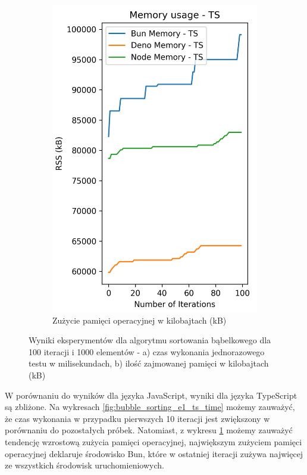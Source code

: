 \begin{figure}[H]
\begin{subfigure}[b]{0.42\textwidth}
    \includegraphics[width=\textwidth]{Figures/sorting/sorting_bubble_100_1000_ts_memory.png}
    \caption{Zużycie pamięci operacyjnej w kilobajtach (kB)}
    \label{fig:bubble_sorting_e1_ts_memory}
  \end{subfigure}
  \caption{Wyniki eksperymentów dla algorytmu sortowania bąbelkowego dla 100 iteracji i 1000 elementów - a) czas wykonania jednorazowego testu w milisekundach, b) ilość zajmowanej pamięci w kilobajtach (kB)}
  \label{fig:bubble_sorting_e1_ts}
\end{figure}

W porównaniu do wyników dla języka JavaScript, wyniki dla języka TypeScript są zbliżone. Na wykresach \ref{fig:bubble_sorting_e1_ts_time} możemy zauważyć, że czas wykonania w przypadku pierwszych 10 iteracji jest zwiększony w porównaniu do pozostałych próbek. Natomiast, z wykresu \ref{fig:bubble_sorting_e1_ts_memory} możemy zauważyć tendencję wzrostową zużycia pamięci operacyjnej, największym zużyciem pamięci operacyjnej deklaruje środowisko Bun, które w ostatniej iteracji zużywa najwięcej ze wszystkich środowisk uruchomieniowych.

